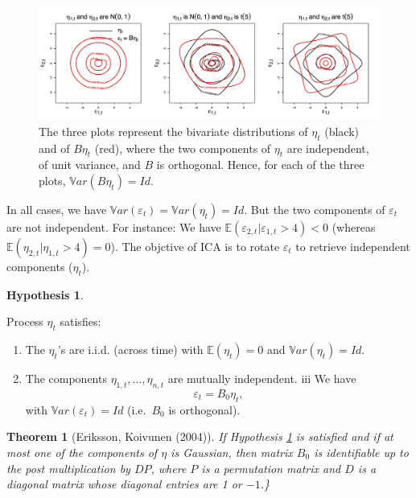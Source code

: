 \documentclass[
  12pt,
]{book}
\providecommand{\tightlist}{%
  \setlength{\itemsep}{0pt}\setlength{\parskip}{0pt}}
\newtheorem{theorem}{Theorem}[chapter]
\theoremstyle{definition}
\theoremstyle{definition}
\theoremstyle{definition}
\theoremstyle{definition}
\newtheorem{hypothesis}{Hypothesis}[chapter]
\theoremstyle{remark}
\begin{document}
\begin{figure}
\includegraphics[width=0.95\linewidth]{images/Figure_E} \caption{The three plots represent the bivariate distributions of $\eta_t$ (black) and of $B\eta_t$ (red), where the two components of $\eta_t$ are independent, of unit variance, and $B$ is orthogonal. Hence, for each of the three plots, $\mathbb{V}ar(B\eta_t)=Id$.}\label{fig:ThreePlots}
\end{figure}

In all cases, we have \(\mathbb{V}ar(\varepsilon_t)=\mathbb{V}ar(\eta_t)=Id\). But the two components of \(\varepsilon_t\) are not independent. For instance: We have \(\mathbb{E}(\varepsilon_{2,t}|\varepsilon_{1,t}>4)<0\) (whereas \(\mathbb{E}(\eta_{2,t}|\eta_{1,t}>4)=0\)). The objctive of ICA is to rotate \(\varepsilon_t\) to retrieve independent components (\(\eta_t\)).

\begin{hypothesis}
\protect\hypertarget{hyp:NonGauss}{}\label{hyp:NonGauss}

Process \(\eta_t\) satisfies:

\begin{enumerate}
\def\labelenumi{\roman{enumi}.}
\tightlist
\item
  The \(\eta_t\)'s are i.i.d. (across time) with \(\mathbb{E}(\eta_t) = 0\) and \(\mathbb{V}ar(\eta_t) = Id.\)
\item
  The components \(\eta_{1,t}, \ldots, \eta_{n,t}\) are mutually independent.
  iii We have
  \[
  \varepsilon_t = B_0 \eta_t,
  \]
  with \(\mathbb{V}ar(\varepsilon_t) = Id\) (i.e.~\(B_0\) is orthogonal).
\end{enumerate}

\end{hypothesis}

\begin{theorem}[Eriksson, Koivunen (2004)]
\protect\hypertarget{thm:EK2004}{}\label{thm:EK2004}If Hypothesis \ref{hyp:NonGauss} is satisfied and if at most one of the components of \(\eta\) is Gaussian, then matrix \(B_0\) is identifiable up to the post multiplication by \(DP\), where \(P\) is a permutation matrix and \(D\) is a diagonal matrix whose diagonal entries are 1 or \(-1\).\}
\end{theorem}
\end{document}
